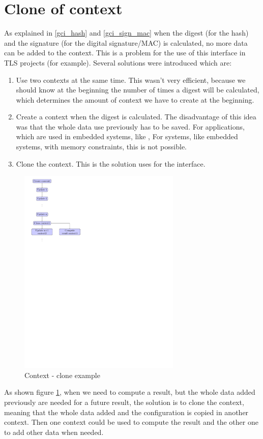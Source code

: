 \section{Clone of context}
\label{gci_cl_ctx}
As explained in \ref{gci_hash} and \ref{gci_sign_mac} when the digest (for the hash)
and the signature (for the digital signature/MAC) is calculated, no more data
can be added to the context.
This is a problem for the use of this interface in TLS projects (\embtls for
example).
Several solutions were introduced which are:
\begin{enumerate}
  \item Use two contexts at the same time.\newline
  This wasn't very efficient, because we should know at the beginning the
  number of times a digest will be calculated, which determines the amount of
  context we have to create at the beginning.
  \item Create a context when the digest is calculated.\newline
  The disadvantage of this idea was that the whole data use previously has to be
  saved. For applications, which are used in embedded systems, like \embtls, For
  systems, like embedded systems, with memory constraints, this is not possible.
  \item Clone the context. This is the solution uses for the interface.\newline
\end{enumerate}
\begin{figure}[!ht]
\centering
\includegraphics[trim=0cm 18.5cm 9.5cm 0cm,
height=10cm]{figures/hash_signature_clone.pdf}
\caption{Context - clone example\newline}
\label{fig:gci_clone}
\end{figure}
As shown figure \ref{fig:gci_clone}, when we need to compute a result, but the
whole data added previously are needed for a future result, the solution is to
clone the context, meaning that the whole data added and the configuration is copied in another context.\newline
Then one context could be used to compute the result and the other one
to add other data when needed.\newline



